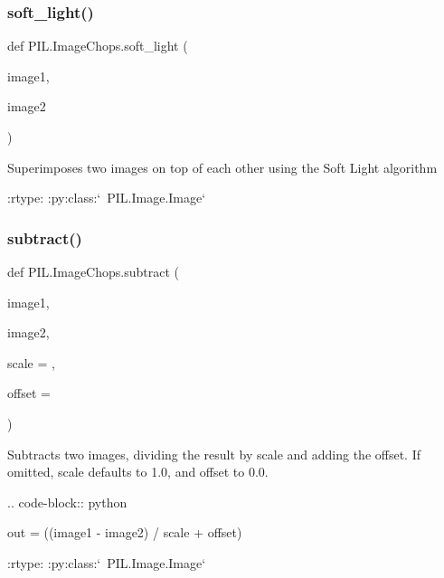 \subsubsection{\texorpdfstring{soft\+\_\+light()}{soft\_light()}}
{\footnotesize\ttfamily def P\+I\+L.\+Image\+Chops.\+soft\+\_\+light (\begin{DoxyParamCaption}\item[{}]{image1,  }\item[{}]{image2 }\end{DoxyParamCaption})}

\begin{DoxyVerb}Superimposes two images on top of each other using the Soft Light algorithm

:rtype: :py:class:`~PIL.Image.Image`
\end{DoxyVerb}
 \mbox{\label{namespacePIL_1_1ImageChops_afcaf43f590a953e3c9b2569cecdf9dcf}} 
\subsubsection{\texorpdfstring{subtract()}{subtract()}}
{\footnotesize\ttfamily def P\+I\+L.\+Image\+Chops.\+subtract (\begin{DoxyParamCaption}\item[{}]{image1,  }\item[{}]{image2,  }\item[{}]{scale = {},  }\item[{}]{offset = {} }\end{DoxyParamCaption})}

\begin{DoxyVerb}Subtracts two images, dividing the result by scale and adding the offset.
If omitted, scale defaults to 1.0, and offset to 0.0.

.. code-block:: python

    out = ((image1 - image2) / scale + offset)

:rtype: :py:class:`~PIL.Image.Image`
\end{DoxyVerb}
 \mbox{\label{namespacePIL_1_1ImageChops_a46edd6ee7a7c6f7f04d1582014326483}} 
